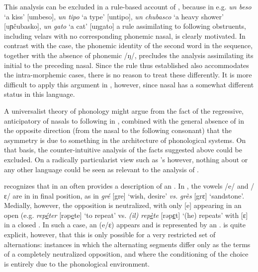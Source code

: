 This analysis can be excluded in a rule-based account of ,
because in e.g. \emph{un beso} `a kiss' {[umbeso]}, \emph{un tipo} `a
type' {[untipo]}, \emph{un chubasco} `a heavy shower' {[uɲčubasko]},
\emph{un gato} `a cat' {[uŋgato]} a rule assimilating 
to following obstruents, including velars with no corresponding
phonemic nasal, is clearly motivated. In {contrast} with the 
case, the phonemic identity of the second word in the sequence,
together with the absence of phonemic /ŋ/, precludes the analysis
assimilating its initial to the preceding nasal. Since the rule thus
established also accommodates the intra-morphemic cases, there is no
reason to treat these differently. It is more difficult to apply this
argument in , however, since nasal  has a somewhat
different status in this language.

A universalist theory of phonology might argue from the fact of the
regressive, anticipatory  of nasals to following
 in , combined with the general absence
of  in the opposite direction (from the nasal to the
following consonant) that the asymmetry is due to something in the
architecture of phonological systems. On that basis, the
counter-intuitive analysis of the  facts suggested above could
be excluded. On a radically particularist view such as {\Martinet}'s
however, nothing about  or any other language could be seen as
relevant to the analysis of .
  
{\Martinet} recognizes that  in an  often
provides a description of an . In , the vowels /e/
and /ɛ/ are in  in final position, as in \emph{gré} {[gre]}
`wish, desire' \emph{vs.} \emph{grès} {[grɛ]} `sandstone'. Medially,
however, the opposition is neutralized, with only {[e]} appearing in
an open  (e.g. \emph{rep\underline{é}ter}
{[rəp\underline{e}te]} `to repeat' vs. \emph{ (il) rep\underline{è}te}
{[rəp\underline{ɛ}t]} `(he) repeats' with {[ɛ]} in a closed . 
In such a case, an 
(e/ɛ) appears and is represented by an .  {\Martinet} is
quite explicit, however, that this is only possible for a very
restricted set of alternations: instances in which the alternating
segments differ only as the terms of a completely neutralized
opposition, and where the conditioning of the choice is entirely due
to the phonological environment.


